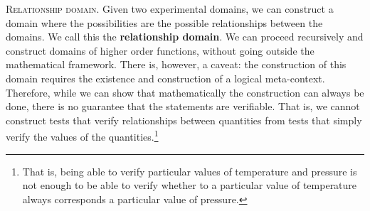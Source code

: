 \documentclass[10pt,twocolumn, nofootinbib]{revtex4-2}
\newcommand\partitle[1]{\textsc{#1}.}
\begin{document}
\partitle{Relationship domain} Given two experimental domains, we can construct a domain where the possibilities are the possible relationships between the domains. We call this the \textbf{relationship domain}. We can proceed recursively and construct domains of higher order functions, without going outside the mathematical framework. There is, however, a caveat: the construction of this domain requires the existence and construction of a logical meta-context. Therefore, while we can show that mathematically the construction can always be done, there is no guarantee that the statements are verifiable. That is, we cannot construct tests that verify relationships between quantities from tests that simply verify the values of the quantities.\footnote{That is, being able to verify particular values of temperature and pressure is not enough to be able to verify whether to a particular value of temperature always corresponds a particular value of pressure.}


\end{document}
